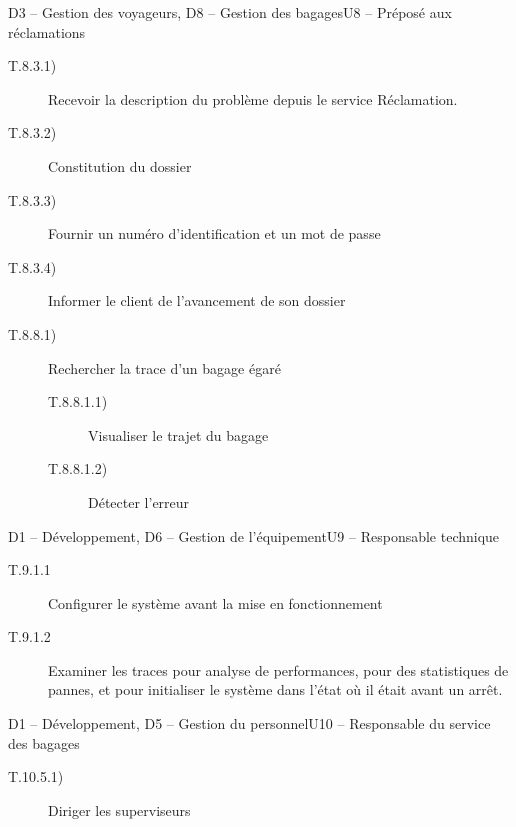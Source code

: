 \dta
{D3 -- Gestion des voyageurs, D8 -- Gestion des bagages}{U8 -- Préposé aux réclamations}
{}
{
\begin{description}
	\item [T.8.3.1)] Recevoir la description du problème depuis le service \og Réclamation\fg. \typeactivite{[système]}
	\item [T.8.3.2)] Constitution du dossier \typeactivite{[système]} 
	\item [T.8.3.3)] Fournir un numéro d'identification et un mot de passe \typeactivite{[système]}
	\item [T.8.3.4)] Informer le client de l'avancement de son dossier \typeactivite{[manuel]}
	\item [T.8.8.1)] Rechercher la trace d'un bagage égaré
	\begin{description}
		\item [T.8.8.1.1)] Visualiser le trajet du bagage \typeactivite{[système]}
		\item [T.8.8.1.2)] Détecter l'erreur \typeactivite{[système]}
	\end{description}
\end{description}
}

\dta
{D1 -- Développement, D6 -- Gestion de l'équipement}{U9 -- Responsable technique}
{}
{
\begin{description}
	\item[T.9.1.1] Configurer le système avant la mise en fonctionnement \typeactivite{[système]}
	\item[T.9.1.2] Examiner les traces pour analyse de performances, pour des statistiques de pannes, et pour initialiser le système dans l'état où il était avant un arrêt. \typeactivite{[système]}
\end{description}
}

\dta
{D1 -- Développement, D5 -- Gestion du personnel}{U10 -- Responsable du service des bagages}{~}
{
\begin{description}
	\item [T.10.5.1)] Diriger les superviseurs
\end{description}
}

